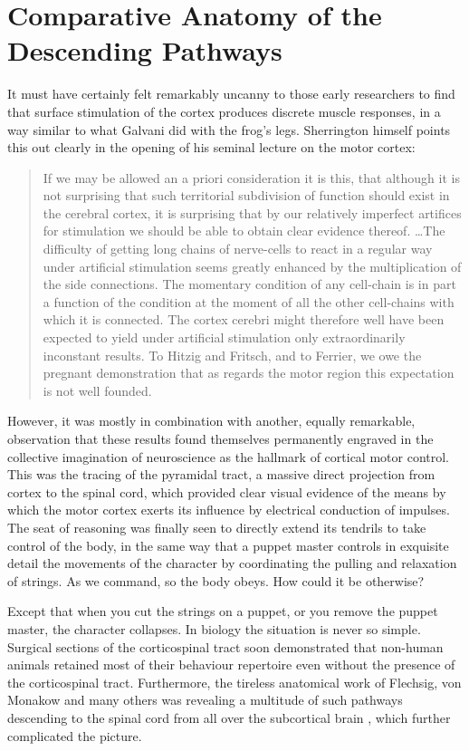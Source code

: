 \section{Comparative Anatomy of the Descending Pathways}

It must have certainly felt remarkably uncanny to those early researchers to find that surface stimulation of the cortex produces discrete muscle responses, in a way similar to what Galvani did with the frog's legs. Sherrington himself points this out clearly in the opening of his seminal lecture on the motor cortex:

\blockquote[{\protect\cite[p.271]{Sherrington1906}}]{If we may be allowed an a priori consideration it is this, that although it is not surprising that such territorial subdivision of function should exist in the cerebral cortex, it is surprising that by our relatively imperfect artifices for stimulation we should be able to obtain clear evidence thereof. \ldots The difficulty of getting long chains of nerve-cells to react in a regular way under artificial stimulation seems greatly enhanced by the multiplication of the side connections. The momentary condition of any cell-chain is in part a function of the condition at the moment of all the other cell-chains with which it is connected. The cortex cerebri might therefore well have been expected to yield under artificial stimulation only extraordinarily inconstant results. To Hitzig and Fritsch, and to Ferrier, we owe the pregnant demonstration that as regards the motor region this expectation is not well founded.}

However, it was mostly in combination with another, equally remarkable, observation that these results found themselves permanently engraved in the collective imagination of neuroscience as the hallmark of cortical motor control. This was the tracing of the pyramidal tract, a massive direct projection from cortex to the spinal cord, which provided clear visual evidence of the means by which the motor cortex exerts its influence by electrical conduction of impulses. The seat of reasoning was finally seen to directly extend its tendrils to take control of the body, in the same way that a puppet master controls in exquisite detail the movements of the character by coordinating the pulling and relaxation of strings. As we command, so the body obeys. How could it be otherwise?

Except that when you cut the strings on a puppet, or you remove the puppet master, the character collapses. In biology the situation is never so simple. Surgical sections of the corticospinal tract soon demonstrated that non-human animals retained most of their behaviour repertoire even without the presence of the corticospinal tract. Furthermore, the tireless anatomical work of Flechsig, von Monakow and many others was revealing a multitude of such pathways descending to the spinal cord from all over the subcortical brain \cite{Nathan1955}, which further complicated the picture.

